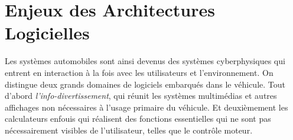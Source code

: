 

\section{Enjeux des Architectures Logicielles}

Les systèmes automobiles sont ainsi devenus des systèmes cyberphysiques qui entrent en interaction à la fois avec les utilisateurs et l'environnement. On distingue deux grands domaines de logiciels embarqués dans le véhicule. Tout d'abord \emph{l'info-divertissement}, qui réunit les systèmes multimédias et autres affichages non nécessaires à l'usage primaire du véhicule. Et deuxièmement les calculateurs enfouis qui réalisent des fonctions essentielles qui ne sont pas nécessairement visibles de l'utilisateur, telles que le contrôle moteur. 


